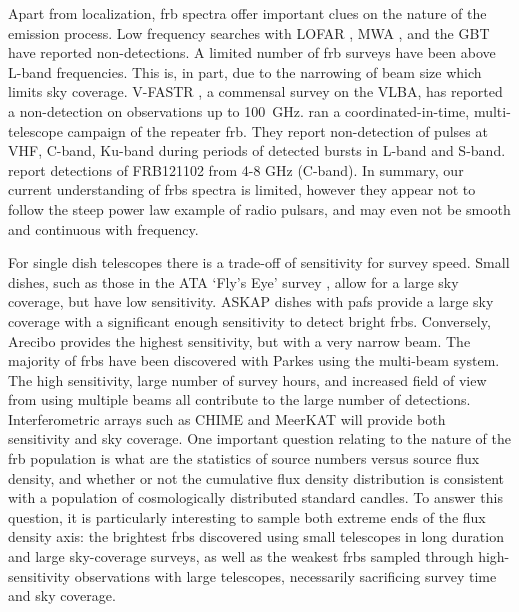 \documentclass[a4paper,fleqn,usenatbib]{mnras}
\begin{document}
Apart from localization, \gls{frb} spectra offer important clues on the nature
of the emission process. Low frequency searches with LOFAR
\citep{2015MNRAS.452.1254K}, MWA \citep{2015AJ....150..199T}, and the GBT
\citep{2017arXiv170107457C} have reported non-detections.
A limited number of \gls{frb} surveys have been above L-band frequencies.
This is, in part, due to the narrowing of beam size which limits sky coverage.
V-FASTR \citep{2016ApJ...826..223B}, a commensal survey on the VLBA, has
reported a non-detection on observations up to 100~GHz.
\cite{2017arXiv170507553L} ran a coordinated-in-time, multi-telescope campaign
of the repeater \gls{frb}.  They report non-detection of pulses at VHF, C-band,
Ku-band during periods of detected bursts in L-band and S-band. \cite{atel10675}
report detections of FRB121102 from 4-8 GHz (C-band). In summary, our current
understanding of \glspl{frb} spectra is limited, however they appear not to
follow the steep power law example of radio pulsars, and may even not be smooth
and continuous with frequency.

For single dish telescopes there is a trade-off of sensitivity for survey speed.
Small dishes, such as those in the ATA `Fly's Eye' survey
\citep{2012ApJ...744..109S}, allow for a large sky coverage, but have low
sensitivity.  ASKAP dishes with \glspl{paf} provide a large sky coverage with a
significant enough sensitivity to detect bright \glspl{frb}. Conversely,
Arecibo provides the highest sensitivity, but with a very narrow beam.
The majority of \glspl{frb} have been discovered with Parkes using the
multi-beam system. The high sensitivity, large number of survey hours, and
increased field of view from using multiple beams all contribute to the large
number of detections. Interferometric arrays such as CHIME and MeerKAT will
provide both sensitivity and sky coverage. One important question relating to
the nature of the \gls{frb} population is what are the statistics of source
numbers versus source flux density, and whether or not the cumulative flux
density distribution is consistent with a population of cosmologically
distributed standard candles. To answer this question, it is particularly
interesting to sample both extreme ends of the flux density axis: the brightest
\glspl{frb} discovered using small telescopes in long duration and large
sky-coverage surveys, as well as the weakest \glspl{frb} sampled through
high-sensitivity observations with large telescopes, necessarily sacrificing
survey time and sky coverage. 
\end{document}
